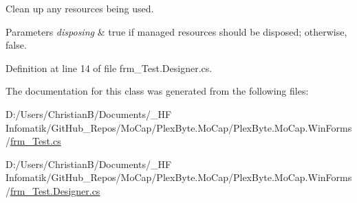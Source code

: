 Clean up any resources being used. 


\begin{DoxyParams}{Parameters}
{\em disposing} & true if managed resources should be disposed; otherwise, false.\\
\hline
\end{DoxyParams}


Definition at line 14 of file frm\+\_\+\+Test.\+Designer.\+cs.



The documentation for this class was generated from the following files\+:\begin{DoxyCompactItemize}
\item 
D\+:/\+Users/\+Christian\+B/\+Documents/\+\_\+\+H\+F Infomatik/\+Git\+Hub\+\_\+\+Repos/\+Mo\+Cap/\+Plex\+Byte.\+Mo\+Cap/\+Plex\+Byte.\+Mo\+Cap.\+Win\+Forms/\hyperlink{frm___test_8cs}{frm\+\_\+\+Test.\+cs}\item 
D\+:/\+Users/\+Christian\+B/\+Documents/\+\_\+\+H\+F Infomatik/\+Git\+Hub\+\_\+\+Repos/\+Mo\+Cap/\+Plex\+Byte.\+Mo\+Cap/\+Plex\+Byte.\+Mo\+Cap.\+Win\+Forms/\hyperlink{frm___test_8_designer_8cs}{frm\+\_\+\+Test.\+Designer.\+cs}\end{DoxyCompactItemize}

